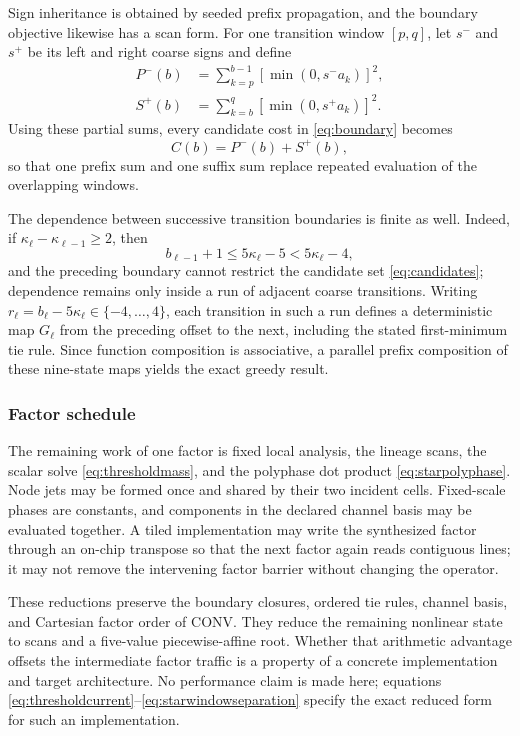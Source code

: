 \documentclass[journal]{IEEEtran}
\begin{document}
Sign inheritance is obtained by seeded prefix propagation, and the boundary
objective likewise has a scan form. For one transition window
\([p,q]\), let \(s^-\) and \(s^+\) be its left and right coarse signs and
define
\begin{align}
 P^-(b)&=\sum_{k=p}^{b-1}[\min(0,s^-a_k)]^2,\nonumber\\
 S^+(b)&=\sum_{k=b}^{q}[\min(0,s^+a_k)]^2.
 \label{eq:starconflictscan}
\end{align}
Using these partial sums, every candidate cost in \eqref{eq:boundary} becomes
\begin{equation}
 C(b)=P^-(b)+S^+(b),
 \label{eq:starboundarycost}
\end{equation}
so that one prefix sum and one suffix sum replace repeated evaluation of the
overlapping windows.

The dependence between successive transition boundaries is finite as well.
Indeed, if \(\kappa_\ell-\kappa_{\ell-1}\geq2\), then
\begin{equation}
 b_{\ell-1}+1\leq5\kappa_\ell-5<5\kappa_\ell-4,
 \label{eq:starwindowseparation}
\end{equation}
and the preceding boundary cannot restrict the candidate set
\eqref{eq:candidates}; dependence remains only inside a run of adjacent
coarse transitions. Writing
\(r_\ell=b_\ell-5\kappa_\ell\in\{-4,\ldots,4\}\), each transition in such a
run defines a deterministic map \(G_\ell\) from the preceding offset to the
next, including the stated first-minimum tie rule. Since function composition
is associative, a parallel prefix composition of these nine-state maps yields
the exact greedy result.

\subsubsection{Factor schedule}

The remaining work of one factor is fixed local analysis, the lineage scans,
the scalar solve \eqref{eq:thresholdmass}, and the polyphase dot product
\eqref{eq:starpolyphase}. Node jets may be formed once and shared by their two
incident cells. Fixed-scale phases are constants, and components in the
declared channel basis may be evaluated together. A tiled implementation may
write the synthesized factor through an on-chip transpose so that the next
factor again reads contiguous lines; it may not remove the intervening factor
barrier without changing the operator.

These reductions preserve the boundary closures, ordered tie rules, channel
basis, and Cartesian factor order of CONV. They reduce the remaining
nonlinear state to scans and a five-value piecewise-affine root. Whether that
arithmetic advantage offsets the intermediate factor traffic is a property
of a concrete implementation and target architecture. No performance claim
is made here; equations \eqref{eq:thresholdcurrent}--\eqref{eq:starwindowseparation}
specify the exact reduced form for such an implementation.
\end{document}
